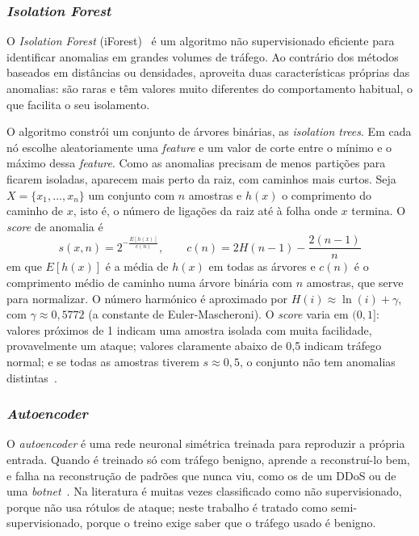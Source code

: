 \documentclass[conference,a4paper]{IEEEtran}
\begin{document}
\subsubsection{\textit{Isolation Forest}}
O \textit{Isolation Forest} (iForest)~\cite{liu2008isolation} é um algoritmo não
supervisionado eficiente para identificar anomalias em grandes volumes de tráfego. Ao
contrário dos métodos baseados em distâncias ou densidades, aproveita duas
características próprias das anomalias: são raras e têm valores muito diferentes do
comportamento habitual, o que facilita o seu isolamento.

O algoritmo constrói um conjunto de árvores binárias, as \textit{isolation trees}. Em
cada nó escolhe aleatoriamente uma \textit{feature} e um valor de corte entre o mínimo e
o máximo dessa \textit{feature}. Como as anomalias precisam de menos partições para
ficarem isoladas, aparecem mais perto da raiz, com caminhos mais curtos. Seja
$X=\{x_1,\dots,x_n\}$ um conjunto com $n$ amostras e $h(x)$ o comprimento do caminho de
$x$, isto é, o número de ligações da raiz até à folha onde $x$ termina. O \textit{score}
de anomalia é
\begin{equation}
s(x,n) = 2^{-\frac{E[h(x)]}{c(n)}},\qquad c(n) = 2H(n-1) - \frac{2(n-1)}{n}
\label{eq:iforest}
\end{equation}
em que $E[h(x)]$ é a média de $h(x)$ em todas as árvores e $c(n)$ é o comprimento médio
de caminho numa árvore binária com $n$ amostras, que serve para normalizar. O número
harmónico é aproximado por $H(i)\approx \ln(i)+\gamma$, com $\gamma \approx 0{,}5772$ (a
constante de Euler-Mascheroni). O \textit{score} varia em $(0,1]$: valores próximos de 1
indicam uma amostra isolada com muita facilidade, provavelmente um ataque; valores
claramente abaixo de 0,5 indicam tráfego normal; e se todas as amostras tiverem
$s\approx 0{,}5$, o conjunto não tem anomalias distintas~\cite{liu2008isolation}.

\subsubsection{\textit{Autoencoder}}
O \textit{autoencoder} é uma rede neuronal simétrica treinada para reproduzir a própria
entrada. Quando é treinado só com tráfego benigno, aprende a reconstruí-lo bem, e falha
na reconstrução de padrões que nunca viu, como os de um DDoS ou de uma
\textit{botnet}~\cite{mirsky2018kitsune}. Na literatura é muitas vezes classificado como
não supervisionado, porque não usa rótulos de ataque; neste trabalho é tratado como
semi-supervisionado, porque o treino exige saber que o tráfego usado é benigno.
\end{document}
